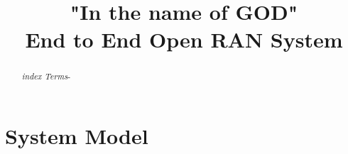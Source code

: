 \documentclass[onecolumn,draftcls]{IEEEtran}
\begin{document}
\title{"In the name of GOD" \\[2in] End to End Open RAN System } \author{

    \vspace{2cm}
    }

\maketitle

\newpage
\begin{abstract}



 \emph{index Terms}-
\end{abstract}
\IEEEpeerreviewmaketitle
\newpage
\tableofcontents
\newpage
\listoffigures
\listoftables
\newpage
\section{System Model}


\newpage


\
\end{document}
